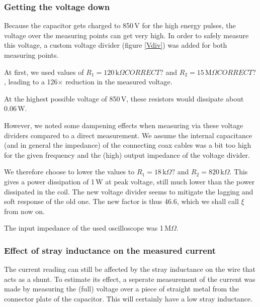 \subsubsection{Getting the voltage down}
Because the capacitor gets charged to 850\,V for the high energy pulses, 
the voltage over the measuring points can get very high. In order to safely 
measure this voltage, a custom voltage divider (figure \ref{Vdiv}) was 
added for both measuring points.


At first, we used values of $R_1 = 120\,\mathrm{k}\Omega CORRECT?$ and $R_2 
= 15\,\mathrm{M}\Omega CORRECT?$, leading to a 126$\times$ reduction in the 
measured voltage.

At the highest possible voltage of 850\,V, these resistors would dissipate 
about 0.06\,W.

However, we noted some dampening effects when measuring via these voltage 
dividers compared to a direct measurement. We assume the internal 
capacitance (and in general the impedance) of the connecting coax cables 
was a bit too high for the given frequency and the (high) output impedance 
of the voltage divider.


We therefore choose to lower the values to $R_1 = 18\,\mathrm{k}\Omega?$ 
and $R_2 = 820\,\mathrm{k}\Omega$. This gives a power dissipation of 1\,W 
at peak voltage, still much lower than the power dissipated in the coil.  
The new voltage divider seems to mitigate the lagging and soft response of 
the old one. The new factor is thus 46.6, which we shall call $\xi$ from 
now on.






The input impedance of the used oscilloscope was 1\,M$\Omega$.



\subsubsection{Effect of stray inductance on the measured current}
The current reading can still be affected by the stray inductance on the 
wire that acts as a shunt. To estimate its effect, a seperate measurement 
of the current was made by measuring the (full) voltage over a piece of 
straight metal from the connector plate of the capacitor. This will 
certainly have a low stray inductance.


